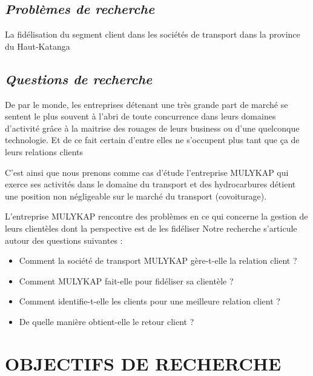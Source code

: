 \documentclass[a4paper,12pt,oneside]{book}
\begin{document}
        \subsection[Problèmes de recherche]{\textit{Problèmes de recherche}}
        La fidélisation du segment client dans les sociétés de transport
        dans la province du Haut-Katanga

        \subsection[Questions de recherche]{\textit{Questions de recherche}}
        De par le monde, les entreprises détenant une très grande part de marché
        se sentent le plus souvent à l’abri de toute concurrence dans leurs domaines d’activité
        grâce à la maitrise des rouages de leurs business ou
        d’une quelconque technologie. \cite*{Rouviere2010} Et de ce fait certain
        d’entre elles ne s’occupent plus tant que ça de leurs relations clients
        \newline

        C’est ainsi que nous prenons comme cas d’étude l’entreprise MULYKAP qui exerce 
        ses activités dans le domaine du transport et des hydrocarbures détient
        une position non négligeable sur le marché du transport (covoiturage).
        \newline

        L’entreprise MULYKAP rencontre des problèmes en ce qui concerne
        la gestion de leurs clientèles dont la perspective est de les
        fidéliser
        Notre recherche s’articule autour des questions suivantes :
            \begin{itemize}
                \item Comment la société de transport MULYKAP gère-t-elle
                la relation client ?
                \item Comment MULYKAP fait-elle pour fidéliser sa clientèle ?
                \item Comment identifie-t-elle les clients pour une
                meilleure relation client ?
                \item De quelle manière obtient-elle le retour client ?
            \end{itemize}

    \section[Objectifs de recherche]{OBJECTIFS DE RECHERCHE}
\end{document}
